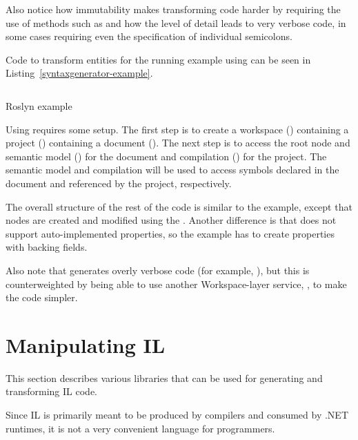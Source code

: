 Also notice how immutability makes transforming code harder by requiring the use of methods such as  and how the level of detail leads to very verbose code, in some cases requiring even the specification of individual semicolons.

\medskip

Code to transform entities for the running example using  can be seen in Listing~\ref{syntaxgenerator-example}.

\begin{listing}
\inputminted[firstline=17,lastline=73]{csharp}{samples/Roslyn.SyntaxGenerator/Program.cs}
\caption{Roslyn  example}
\label{syntaxgenerator-example}
\end{listing}

Using  requires some setup. The first step is to create a workspace () containing a project () containing a document (). The next step is to access the root node and semantic model () for the document and compilation () for the project. The semantic model and compilation will be used to access symbols declared in the document and referenced by the project, respectively.

The overall structure of the rest of the code is similar to the  example, except that nodes are created and modified using the . Another difference is that  does not support auto-implemented properties, so the example has to create properties with backing fields.

Also note that  generates overly verbose code (for example, ), but this is counterweighted by being able to use another Workspace-layer service, , to make the code simpler.


\section{Manipulating \acs{IL}}

This section describes various libraries that can be used for generating and transforming \ac{IL} code.

Since \ac{IL} is primarily meant to be produced by compilers and consumed by .NET runtimes, it is not a very convenient language for programmers.


